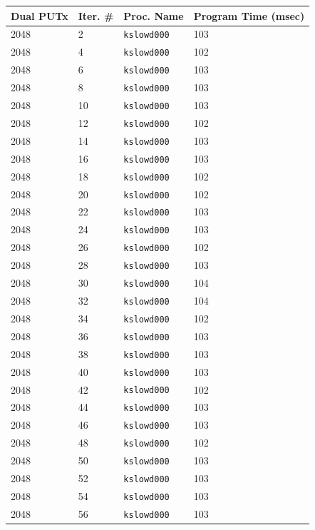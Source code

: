 \documentclass[10pt]{article}
\begin{document}
\begin{table}[htp!]
\centering
{
 \begin{tabular}{|l|l|l|l|} \hline
Dual PUTx & Iter. \# & Proc. Name & Program Time (msec)\\ \hline
2048 & 2 & {\tt kslowd000} & 103 \\ \hline
2048 & 4 & {\tt kslowd000} & 102 \\ \hline
2048 & 6 & {\tt kslowd000} & 103 \\ \hline
2048 & 8 & {\tt kslowd000} & 103 \\ \hline
2048 & 10 & {\tt kslowd000} & 103 \\ \hline
2048 & 12 & {\tt kslowd000} & 102 \\ \hline
2048 & 14 & {\tt kslowd000} & 103 \\ \hline
2048 & 16 & {\tt kslowd000} & 103 \\ \hline
2048 & 18 & {\tt kslowd000} & 102 \\ \hline
2048 & 20 & {\tt kslowd000} & 102 \\ \hline
2048 & 22 & {\tt kslowd000} & 103 \\ \hline
2048 & 24 & {\tt kslowd000} & 103 \\ \hline
2048 & 26 & {\tt kslowd000} & 102 \\ \hline
2048 & 28 & {\tt kslowd000} & 103 \\ \hline
2048 & 30 & {\tt kslowd000} & 104 \\ \hline
2048 & 32 & {\tt kslowd000} & 104 \\ \hline
2048 & 34 & {\tt kslowd000} & 102 \\ \hline
2048 & 36 & {\tt kslowd000} & 103 \\ \hline
2048 & 38 & {\tt kslowd000} & 103 \\ \hline
2048 & 40 & {\tt kslowd000} & 103 \\ \hline
2048 & 42 & {\tt kslowd000} & 102 \\ \hline
2048 & 44 & {\tt kslowd000} & 103 \\ \hline
2048 & 46 & {\tt kslowd000} & 103 \\ \hline
2048 & 48 & {\tt kslowd000} & 102 \\ \hline
2048 & 50 & {\tt kslowd000} & 103 \\ \hline
2048 & 52 & {\tt kslowd000} & 103 \\ \hline
2048 & 54 & {\tt kslowd000} & 103 \\ \hline
2048 & 56 & {\tt kslowd000} & 103 \\ \hline

\end{tabular}}
\end{table}
\end{document}
